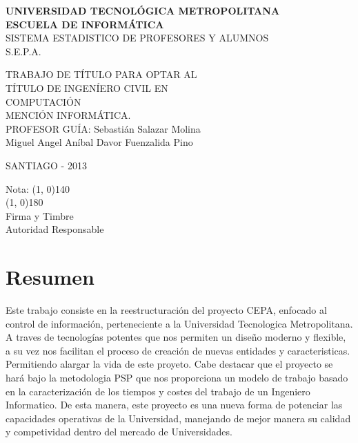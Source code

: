 \documentclass[a4paper,12pt,openany,oneside]{book}
\begin{document}
\thispagestyle{empty}
\begin{center}
\textbf{UNIVERSIDAD TECNOLÓGICA METROPOLITANA\\
ESCUELA DE INFORMÁTICA}\\
\vspace{3cm}
SISTEMA ESTADISTICO DE PROFESORES Y ALUMNOS\\S.E.P.A.
\end{center}
\begin{flushright}
TRABAJO DE TÍTULO PARA OPTAR AL\\
TÍTULO DE INGENÍERO CIVIL EN\\
COMPUTACIÓN\\
MENCIÓN INFORMÁTICA.\\
\vspace{3cm}
PROFESOR GUÍA: Sebastián Salazar Molina\\
\vspace{1.5cm}
Miguel Angel Aníbal Davor Fuenzalida Pino
\end{flushright}
\vspace{4cm}
\begin{center}
SANTIAGO - 2013
\end{center}
\newpage
\thispagestyle{empty}
\begin{flushright}
\vspace{20mm}
Nota: \line(1, 0){140} \\
\vspace{30 mm}
\line(1, 0){180}\\	
Firma y Timbre\\
Autoridad Responsable
\end{flushright}
\chapter*{Resumen}
\thispagestyle{empty}
Este trabajo consiste en la reestructuración del proyecto CEPA, enfocado al control de información, perteneciente a la Universidad Tecnologica Metropolitana. A traves de tecnologías potentes que nos permiten un diseño moderno y flexible, a su vez nos facilitan el proceso de creación de nuevas entidades y caracteristicas. Permitiendo alargar la vida de este proyeto. Cabe destacar que el proyecto se hará bajo la metodologia PSP que nos proporciona un modelo de trabajo basado en la caracterización de los tiempos y costes del trabajo de un Ingeniero Informatico. De esta manera, este proyecto es una nueva forma de potenciar las capacidades operativas de la Universidad, manejando de mejor manera su calidad y competividad dentro del mercado de Universidades.
\end{document}
